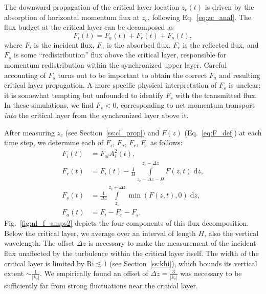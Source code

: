 \documentclass[
        fleqn,
        usenatbib,
    ]{mnras}
\newcommand*{\abs}[1]{\left|#1\right|}
\newcommand*{\ev}[1]{\left\langle#1\right\rangle}
\newcommand*{\z}[1]{\left\{#1\right\}}
\begin{document}
The downward propagation of the critical layer location $z_c(t)$ is driven by
the absorption of horizontal momentum flux at $z_c$, following
Eq.~\eqref{eq:zc_anal}. The flux budget at the critical layer can be decomposed
as
\begin{equation}
    F_i(t) = F_a(t) + F_r(t) + F_s(t),\label{eq:f_budget}
\end{equation}
where $F_i$ is the incident flux, $F_a$ is the absorbed flux, $F_r$ is the
reflected flux, and $F_s$ is some ``redistribution'' flux above the critical
layer, responsible for momentum redistribution within the synchronized upper
layer. Careful accounting of $F_s$ turns out to be important to obtain the
correct $F_a$ and resulting critical layer propagation. A more specific physical
interpretation of $F_s$ is unclear; it is somewhat tempting but unfounded to
identify $F_s$ with the transmitted flux. In these simulations, we find $F_s <
0$, corresponding to net momentum transport \emph{into} the critical layer from
the synchronized layer above it.

After measuring $z_c$ (see Section~\ref{ss:cl_prop}) and $F(z)$
(Eq.~\eqref{eq:F_def}) at each time step, we determine each of $F_i$, $F_a$,
$F_r$, $F_s$ as follows:
\begin{align}
    F_i(t) &= F_{al}A_i^2(t),\\
    F_r(t) &= F_i(t) - \frac{1}{H}
        \int\limits_{z_c - \Delta z - H}^{z_c - \Delta z}F(z, t)\;\mathrm{d}z
        ,\label{eq:fr_def}\\
    F_s(t) &=
        \frac{1}{\Delta z}\int\limits_{z_c}^{z_c + \Delta z}
            \min(F(z, t), 0)\;\mathrm{d}z,
        \label{eq:fs_def}\\
    F_a(t) &= F_i - F_r - F_s.\label{eq:fa_def}
\end{align}
Fig.~\ref{fig:nl_f_amps2} depicts the four components of this flux
decomposition.
Below the critical layer, we average over an interval of length $H$, also the
vertical wavelength. The offset $\Delta z$ is necessary to make the measurement
of the incident flux unaffected by the turbulence within the critical layer
itself. The width of the critical layer is limited by $\mathrm{Ri} \lesssim 1$
(see Section~\ref{ss:khi}), which bounds its vertical extent $\sim
\frac{1}{\abs{k_{z}}}$. We empirically found an offset of $\Delta z =
\frac{3}{\abs{k_z}}$ was necessary to be sufficiently far from strong
fluctuations near the critical layer.
\end{document}
